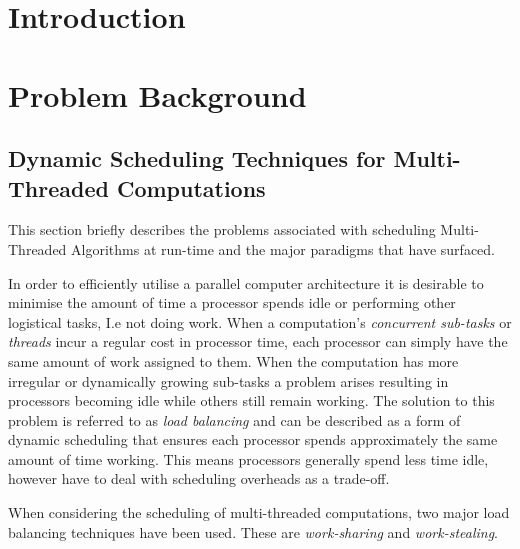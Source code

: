 \chapter{Introduction}

\chapter{Problem Background}

\section{Dynamic Scheduling Techniques for Multi-Threaded Computations}
This section briefly describes the problems associated with scheduling Multi-Threaded Algorithms at run-time and
the major paradigms that have surfaced.

In order to efficiently utilise a parallel computer architecture it is desirable to minimise
the amount of time a processor spends idle or performing other logistical tasks, I.e not doing work. 
When a computation's \textit{concurrent sub-tasks} or \textit{threads} incur a regular cost in processor
time, each processor can simply have the same amount of work assigned to them. When the computation has
more irregular or dynamically growing sub-tasks a problem arises resulting in 
processors becoming idle while others still remain working. The solution to this problem is referred to as
\textit{load balancing} and can be described as a form of dynamic scheduling that ensures each processor 
spends approximately the same amount of time working. This means processors generally spend
less time idle, however have to deal with scheduling overheads as a trade-off.

When considering the scheduling of multi-threaded computations, two major load balancing techniques have been used.
These are \textit{work-sharing} and \textit{work-stealing}.

